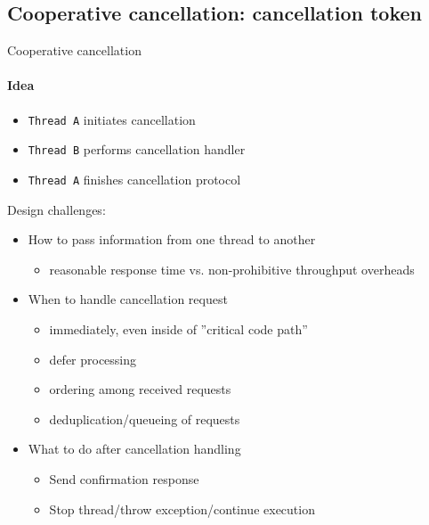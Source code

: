 
\subsection{Cooperative cancellation: cancellation token}
\showTOCSub 

\begin{frame}{Cooperative cancellation}
\framesubtitle{Idea}

\begin{itemize}
    \item \texttt{Thread A} initiates cancellation
    \item \texttt{Thread B} performs cancellation handler
    \item \texttt{Thread A} finishes cancellation protocol
\end{itemize}

\pause
Design challenges:
\begin{itemize}
    \item How to pass information from one thread to another
    \begin{itemize}
        \item reasonable response time  vs. non-prohibitive throughput overheads
    \end{itemize}

    \item When to handle cancellation request
    \begin{itemize}
        \item immediately, even inside of ''critical code path''
        \item defer processing
        \item ordering among received requests
        \item deduplication/queueing of requests
    \end{itemize}

    \item What to do after cancellation handling
    \begin{itemize}
        \item Send confirmation response
        \item Stop thread/throw exception/continue execution
    \end{itemize}
\end{itemize}
\end{frame}

